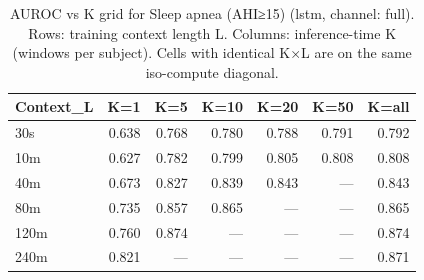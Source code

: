 \begin{table}[ht]
\centering
\caption{AUROC vs K grid for Sleep apnea (AHI≥15) (lstm, channel: full). Rows: training context length L. Columns: inference-time K (windows per subject). Cells with identical K×L are on the same iso-compute diagonal.}
\label{tab:kgrid_apnea_binary_lstm_full}
\begin{tabular}{lrrrrrr}
\toprule
Context_L & K=1 & K=5 & K=10 & K=20 & K=50 & K=all \\
\midrule
30s & 0.638 & 0.768 & 0.780 & 0.788 & 0.791 & 0.792 \\
10m & 0.627 & 0.782 & 0.799 & 0.805 & 0.808 & 0.808 \\
40m & 0.673 & 0.827 & 0.839 & 0.843 & — & 0.843 \\
80m & 0.735 & 0.857 & 0.865 & — & — & 0.865 \\
120m & 0.760 & 0.874 & — & — & — & 0.874 \\
240m & 0.821 & — & — & — & — & 0.871 \\
\bottomrule
\end{tabular}
\end{table}